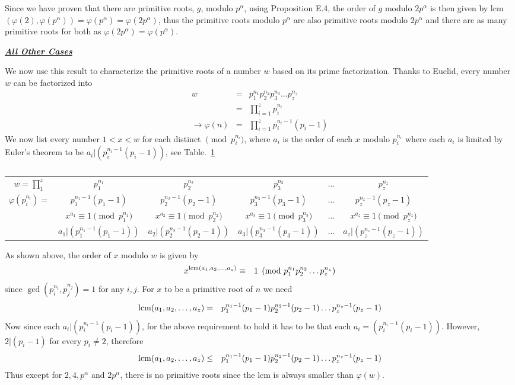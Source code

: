 \documentclass[aps,preprint,preprintnumbers,nofootinbib,showpacs,prd]{revtex4-1}
\newcommand{\nbea}{\begin{eqnarray*}}
\newcommand{\neea}{\end{eqnarray*}}
\begin{document}
Since we have proven that there are primitive roots, $g$, modulo $p^\alpha$, using Proposition E.4, the order of $g$ modulo $2p^\alpha$ is then given by lcm$(\varphi(2),\varphi(p^\alpha)) = \varphi(p^\alpha) = \varphi(2p^\alpha)$, thus the primitive roots modulo $p^\alpha$ are also primitive roots modulo $2p^\alpha$ and there are as many primitive roots for both as $\varphi(2p^\alpha) = \varphi(p^\alpha)$.

\bigskip
\underline{\textbf{\textit{All Other Cases}}}
\bigskip

We now use this result to characterize the primitive roots of a number $w$ based on its prime factorization. Thanks to Euclid, every number $w$ can be factorized into
%
\nbea
w & = & p_1^{n_1}p_2^{n_2}p_3^{n_3} \dots p_z^{n_z} \\
& = & \prod_{i=1}^{z} p_i^{n_i} \\
\to \varphi(n) & = & \prod_{i=1}^{z} p_i^{n_i-1}(p_i - 1)
\neea
%
We now list every number $1 < x < w$ for each distinct $\pmod{p_i^{n_i}}$, where $a_i$ is the order of each $x$ modulo $p_i^{n_i}$ where each $a_i$ is limited by Euler's theorem to be $a_i|(p_i^{n_i-1}(p_i-1))$, see Table.~\ref{Tab:2}
%
\begin{table}[]
\centering
\caption{}
\label{Tab:2}
\begin{tabular}{|c|c|c|c c c|}
\hline
$w=\prod_{1}^{z}$ & $p_1^{n_1}$ & $p_2^{n_2}$ & $p_3^{n_3}$ & $\dots$ & $p_z^{n_z}$ \\
$\varphi(p_i^{n_i}) = $ & $p_1^{n_1-1}(p_1-1)$ & $p_2^{n_2-1}(p_2-1)$ & $p_3^{n_3-1}(p_3-1)$ & $\dots$ & $p_z^{n_z-1}(p_z-1)$ \\ \hline 
 & $x^{a_1} \equiv 1 \pmod{p_1^{n_1}}$ & $x^{a_2} \equiv 1 \pmod{p_2^{n_2}}$ & $x^{a_3} \equiv 1 \pmod{p_3^{n_3}}$ & $\dots$ & $x^{a_z} \equiv 1 \pmod{p_z^{n_z}}$ \\
 & $a_1|(p_1^{n_1-1}(p_1-1))$ & $a_2|(p_2^{n_2-1}(p_2-1))$ & $a_3|(p_3^{n_3-1}(p_3-1))$ & $\dots$ & $a_z|(p_z^{n_z-1}(p_z-1))$ \\ \hline
\end{tabular}
\end{table}
%
As shown above, the order of $x$ modulo $w$ is given by
%
\nbea
x^{{\rm lcm}(a_1, a_2, \dots, a_z)} & \equiv & 1 \pmod{p_1^{n_1}p_2^{n_2} \dots p_z^{n_z}}
\neea
%
since $\gcd(p_i^{n_i},p_j^{n_j}) = 1$ for any $i, j$. For $x$ to be a primitive root of $n$ we need
%
\nbea
{\rm lcm}(a_1, a_2, \dots, a_z) & = & p_1^{n_1-1}(p_1 - 1)p_2^{n_2-1}(p_2 - 1) \dots p_z^{n_z-1}(p_z - 1)
\neea
%
Now since each $a_i|(p_i^{n_i-1}(p_i-1))$, for the above requirement to hold it has to be that each $a_i = (p_i^{n_i-1}(p_i-1))$. However, $2|(p_i-1)$ for every $p_i \neq 2$, therefore
%
\nbea
{\rm lcm}(a_1, a_2, \dots, a_z) & \le & p_1^{n_1-1}(p_1 - 1)p_2^{n_2-1}(p_2 - 1) \dots p_z^{n_z-1}(p_z - 1)
\neea
%
Thus except for $2, 4, p^\alpha$ and $2p^\alpha$, there is no primitive roots since the lcm is always smaller than $\varphi(w)$.
\end{document}

